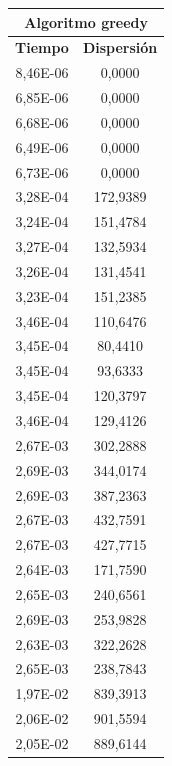 \begin{figure}[h]
\begin{minipage}[l]{0.32\textwidth}
\begin{tabular}{|c|c|}
	        \hline
	    \end{tabular}
	\end{minipage}
	\begin{minipage}[c]{0.32\textwidth}
	    \begin{tabular}{|c|c|}
	        \hline
	        \multicolumn{2}{|c|}{\textbf{Algoritmo greedy}} \\
	        \hline
	        \textbf{Tiempo} & \textbf{Dispersión} \\
	        \hline
	        8,46E-06 &  0,0000\\ 
            6,85E-06 &  0,0000\\ 
            6,68E-06 &  0,0000\\ 
            6,49E-06 &  0,0000\\ 
            6,73E-06 &  0,0000\\ 
            3,28E-04 &  172,9389\\ 
            3,24E-04 &  151,4784\\ 
            3,27E-04 &  132,5934\\ 
            3,26E-04 &  131,4541\\ 
            3,23E-04 &  151,2385\\ 
            3,46E-04 &  110,6476\\ 
            3,45E-04 &  80,4410\\ 
            3,45E-04 &  93,6333\\ 
            3,45E-04 &  120,3797\\ 
            3,46E-04 &  129,4126\\ 
            2,67E-03 &  302,2888\\ 
            2,69E-03 &  344,0174\\ 
            2,69E-03 &  387,2363\\ 
            2,67E-03 &  432,7591\\ 
            2,67E-03 &  427,7715\\ 
            2,64E-03 &  171,7590\\ 
            2,65E-03 &  240,6561\\ 
            2,69E-03 &  253,9828\\ 
            2,63E-03 &  322,2628\\ 
            2,65E-03 &  238,7843\\ 
            1,97E-02 &  839,3913\\ 
            2,06E-02 &  901,5594\\ 
            2,05E-02 &  889,6144\\ 

\end{tabular}
\end{minipage}
\end{figure}
